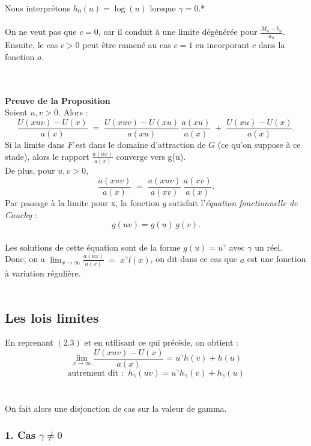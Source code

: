 \documentclass{article}
\begin{document}
Nous interprétons $h_{0}(u) = \log(u)$ lorsque $\gamma = 0$.*
\\
\\
\; On ne veut pas que $c=0$, car il conduit à une limite dégénérée pour $\frac{M_{n} - b_n}{a_n}$. 
Ensuite, le cas $c>0$ peut être ramené au cas $c=1$ en incorporant $c$ dans la fonction $a$. 

\\
\\
\textbf{Preuve de la Proposition}  
\\
Soient $u,v > 0$. Alors :
\[
\frac{U(xuv) - U(x)}{a(x)} 
\;=\; 
\frac{U(xuv) - U(xu)}{a(xu)} \,\frac{a(xu)}{a(x)}
\;+\;
\frac{U(xu) - U(x)}{a(x)}.
\tag{2.3}
\]
Si la limite dans $F$ est dans le domaine d'attraction de $G$ (ce qu'on suppose à ce stade), alors le rapport $\frac{a(ux)}{a(x)}$ converge vers g(u).
\\
De plus, pour $u,v>0$,
\[
\frac{a(xuv)}{a(x)} 
\;=\;
\frac{a(xuv)}{a(xv)} \,\frac{a(xv)}{a(x)}.
\]
Par passage à la limite pour x, la fonction $g$ satisfait l'\textit{équation fonctionnelle de Cauchy} :
\[
g(uv) = g(u)\,g(v).
\]
\\
Les solutions de cette équation sont de la forme $g(u)= u^{\gamma}$ avec $\gamma$ un réel.
\\
Donc, on a $\lim_{x\to \infty} \frac{a(ux)}{a(x)} \;=\; x^{\gamma} l(x)$, on dit dans ce cas que $a$ est une fonction à variation régulière.
\\
\\
\subsection{Les lois limites}
En reprenant $(2.3)$ et en utilisant ce qui précède, on obtient :
\[
\lim_{x\to \infty} \frac{U(xuv) - U(x)}{a(x)} = u^{\gamma} h(v) + h(u)
\]
\[
\text{autrement dit :} \; \; h_{\gamma}(uv)= u^{\gamma} h_{\gamma}(v) + h_{\gamma}(u)
\]
\\
\\
On fait alors une disjonction de cas sur la valeur de gamma.
\\
\subsubsection{1. Cas \(\gamma\neq0\)}
\end{document}
